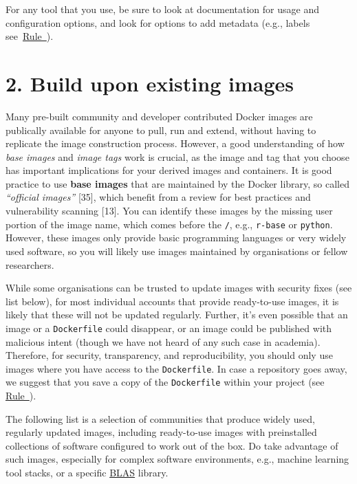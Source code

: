 \documentclass[10pt,letterpaper]{article}
\begin{document}
For any tool that you use, be sure to look at documentation for usage
and configuration options, and look for options to add metadata (e.g.,
labels see~\hyperref[{rule:document}]{Rule~}).

\hypertarget{build-upon-existing-images}{%
\section*{2. Build upon existing
images}\label{build-upon-existing-images}}

  \label{rule:base} 

Many pre-built community and developer contributed Docker images are
publically available for anyone to pull, run and extend, without having
to replicate the image construction process. However, a good
understanding of how \emph{base images} and \emph{image tags} work is
crucial, as the image and tag that you choose has important implications
for your derived images and containers. It is good practice to use
\textbf{base images} that are maintained by the Docker library, so
called \emph{``official images''} {[}35{]}, which benefit from a review
for best practices and vulnerability scanning {[}13{]}. You can identify
these images by the missing user portion of the image name, which comes
before the \texttt{/}, e.g., \texttt{r-base} or \texttt{python}.
However, these images only provide basic programming languages or very
widely used software, so you will likely use images maintained by
organisations or fellow researchers.

While some organisations can be trusted to update images with security
fixes (see list below), for most individual accounts that provide
ready-to-use images, it is likely that these will not be updated
regularly. Further, it's even possible that an image or a
\texttt{Dockerfile} could disappear, or an image could be published with
malicious intent (though we have not heard of any such case in
academia). Therefore, for security, transparency, and reproducibility,
you should only use images where you have access to the
\texttt{Dockerfile}. In case a repository goes away, we suggest that you
save a copy of the \texttt{Dockerfile} within your project (see
\hyperref[{rule:mount}]{Rule~}).

The following list is a selection of communities that produce widely
used, regularly updated images, including ready-to-use images with
preinstalled collections of software configured to work out of the box.
Do take advantage of such images, especially for complex software
environments, e.g., machine learning tool stacks, or a specific
\href{https://en.wikipedia.org/wiki/Basic_Linear_Algebra_Subprograms}{BLAS}
library.
\end{document}
